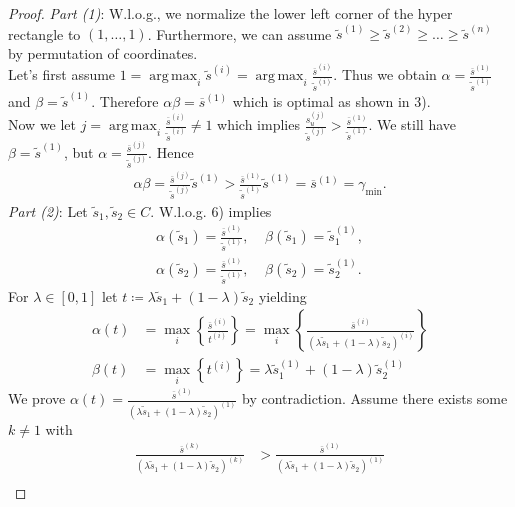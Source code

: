 \documentclass{article}
\DeclareMathOperator*{\argmax}{arg\,max}
\begin{document}
\begin{proof}
		\emph{Part (1)}: W.l.o.g., we normalize the lower left corner of the hyper rectangle to $(1, \ldots, 1)$. Furthermore, we can assume $\tilde{s}^{(1)} \geq \tilde{s}^{(2)} \geq \ldots \geq \tilde{s}^{(n)}$ by permutation of coordinates.\\
		Let's first assume $1 = \argmax_i \tilde{s}^{(i)} = \argmax_i \frac{\overline{s}^{(i)}}{\tilde{s}^{(i)}}$. Thus we obtain $\alpha=\frac{\overline{s}^{(1)}}{\tilde{s}^{(1)}}$ and $\beta = \tilde{s}^{(1)}$. Therefore $\alpha\beta = \overline{s}^{(1)}$ which is optimal as shown in 3).\\
		Now we let $j = \argmax_i \frac{\overline{s}^{(i)}}{\tilde{s}^{(i)}} \neq 1$ which implies $\frac{s_{u}^{(j)}}{\tilde{s}^{(j)}} > \frac{\overline{s}^{(1)}}{\tilde{s}^{(1)}}$. We still have $\beta = \tilde{s}^{(1)}$, but $\alpha = \frac{\overline{s}^{(j)}}{\tilde{s}^{(j)}}$. Hence
		\begin{align*}
		\alpha\beta = \frac{\overline{s}^{(j)}}{\tilde{s}^{(j)}} \tilde{s}^{(1)} > \frac{\overline{s}^{(1)}}{\tilde{s}^{(1)}} \tilde{s}^{(1)} = \overline{s}^{(1)} = \gamma_{\min}.
		\end{align*}
		\emph{Part (2)}: Let $\tilde{s}_1, \tilde{s}_2 \in C$. W.l.o.g. 6) implies 
		\begin{align*}
		\alpha(\tilde{s}_1) = \frac{\overline{s}^{(1)}}{\tilde{s}^{(1)}}, \;\;\;\; \beta(\tilde{s}_1) = \tilde{s}_1^{(1)}, \\
		\alpha(\tilde{s}_2) = \frac{\overline{s}^{(1)}}{\tilde{s}^{(1)}}, \;\;\;\; \beta(\tilde{s}_2) = \tilde{s}_2^{(1)}.
		\end{align*}
		For $\lambda \in [0, 1]$ let $t \coloneqq \lambda \tilde{s}_1 + (1-\lambda) \tilde{s}_2$ yielding
		\begin{align*}
		\alpha(t) &= \max_i \left\{ \frac{\overline{s}^{(i)}}{t^{(i)}} \right\} = \max_i \left\{ \frac{\overline{s}^{(i)}}{(\lambda \tilde{s}_1 + (1-\lambda) \tilde{s}_2)^{(i)}} \right\}\\
		\beta(t) &= \max_i \left\{ t^{(i)} \right\} = \lambda \tilde{s}_1^{(1)} + (1-\lambda) \tilde{s}_2^{(1)}
		\end{align*}
		We prove $\alpha(t) = \frac{\overline{s}^{(1)}}{(\lambda \tilde{s}_1 + (1-\lambda) \tilde{s}_2)^{(1)}}$ by contradiction. Assume there exists some $k \neq 1$ with
		\begin{align*}
		\frac{\overline{s}^{(k)}}{(\lambda \tilde{s}_1 + (1-\lambda) \tilde{s}_2)^{(k)}} &> \frac{\overline{s}^{(1)}}{(\lambda \tilde{s}_1 + (1-\lambda) \tilde{s}_2)^{(1)}}\\

\end{align*}
\end{proof}
\end{document}
